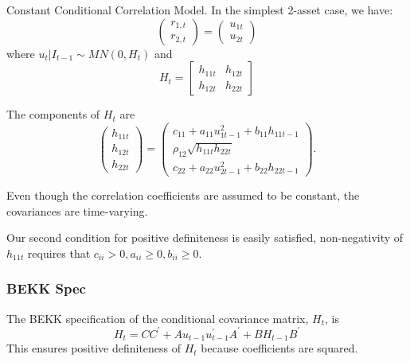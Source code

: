 \documentclass[11pt]{article}
\begin{document}
Constant Conditional Correlation Model. In the simplest 2-asset case, we have:
\begin{equation}
\left(\begin{array}{l}
r_{1, t} \\
r_{2, t}
\end{array}\right)=\left(\begin{array}{l}
u_{1 t} \\
u_{2 t}
\end{array}\right)
\end{equation}
where $u_t|I_{t-1}\sim MN(0,H_t)$ and 
\begin{equation}
H_t=\left[\begin{array}{ll}
h_{11 t} & h_{12 t} \\
h_{12 t} & h_{22 t}
\end{array}\right]
\end{equation}

The components of $H_t$ are
\begin{equation}
\left(\begin{array}{l}
h_{11 t} \\
h_{12 t} \\
h_{22 t}
\end{array}\right)=\left(\begin{array}{c}
c_{11}+a_{11} u_{1 t-1}^2+b_{11} h_{11 t-1} \\
\rho_{12} \sqrt{h_{11 t} h_{22 t}} \\
c_{22}+a_{22} u_{2 t-1}^2+b_{22} h_{22 t-1}
\end{array}\right) .
\end{equation}
\begin{note}
Even though the correlation coefficients are assumed to be constant, the covariances are time-varying.    
\end{note}
Our second condition for positive definiteness is easily satisfied, non-negativity of $h_{11t}$ requires that $c_{ii} > 0, a_{ii} \geq 0, b_{ii} \geq0$.

\subsubsection{BEKK Spec}
The BEKK specification of the conditional covariance matrix, $H_t$, is
\begin{equation}
\label{BEKK spec}
H_t = CC^\prime + A u_{t-1}u_{t-1}^\prime A^\prime + B H_{t-1} B^\prime
\end{equation}
This ensures positive definiteness of $H_t$ because coefficients are squared.
\end{document}
